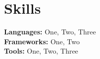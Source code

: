 \documentclass[letterpaper,11pt]{article}
\begin{document}
\section{Skills}
 \begin{itemize}[leftmargin=0.15in, label={}]
    \small{\item{
     \textbf{Languages:} One, Two, Three \\
     \textbf{Frameworks:} One, Two \\
     \textbf{Tools:} One, Two, Three \\
    }}
 \end{itemize}

\end{document}
